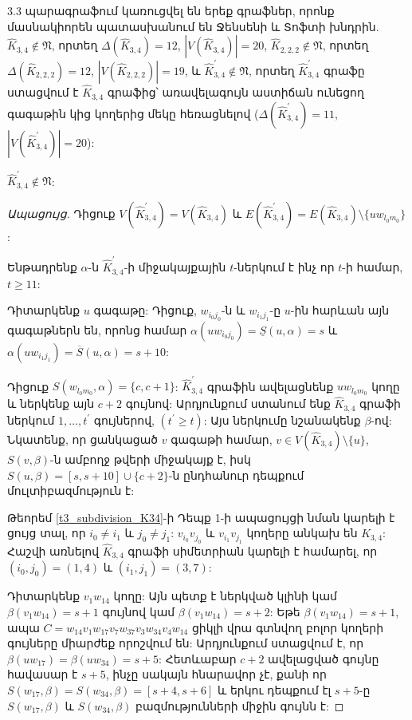 3.3 պարագրաֆում կառուցվել են երեք գրաֆներ, որոնք մասնակիորեն պատասխանում են Ջենսենի և Տոֆտի խնդրին. $\widehat{K}_{3,4} \notin \mathfrak{N}$, որտեղ $\Delta(\widehat{K}_{3,4})=12$, $|V(\widehat{K}_{3,4})|=20$, $\widehat{K}_{2,2,2} \notin \mathfrak{N}$, որտեղ $\Delta(\widehat{K}_{2,2,2})=12$, $|V(\widehat{K}_{2,2,2})|=19$, և  $\widehat{K}_{3,4}^{\prime} \notin \mathfrak{N}$, որտեղ $\widehat{K}_{3,4}^{\prime}$ գրաֆը ստացվում է $\widehat{K}_{3,4}$ գրաֆից՝ առավելագույն աստիճան ունեցող գագաթին կից կողերից մեկը հեռացնելով ($\Delta(\widehat{K}_{3,4}^{\prime})=11$, $|V(\widehat{K}_{3,4}^{\prime})|=20$):

\begin{hide}
\begin{theorem}
\label{t3_subdivision_K34_prime} $\widehat{K}_{3,4}^{\prime}\notin
\mathfrak{N}$:
\end{theorem}
\begin{proof}[Ապացույց]
Դիցուք $V(\widehat{K}_{3,4}^{\prime})= V(\widehat{K}_{3,4})$
և $E(\widehat{K}_{3,4}^{\prime})=E(\widehat{K}_{3,4})\setminus
\{uw_{l_{0}m_{0}}\}$:

Ենթադրենք $\alpha$-ն $\widehat{K}_{3,4}^{\prime}$-ի միջակայքային 
$t$-ներկում է ինչ որ $t$-ի համար, $t\geq 11$:

Դիտարկենք $u$ գագաթը: Դիցուք, $w_{i_{0}j_{0}}$-ն և $w_{i_{1}j_{1}}$-ը $u$-ին հարևան այն գագաթներն են, որոնց համար
$\alpha(uw_{i_{0}j_{0}})=\underline{S}(u,\alpha)=s$ և
$\alpha(uw_{i_{1}j_{1}})=\overline{S}(u,\alpha)=s+10$:

Դիցուք $S(w_{l_{0}m_{0}},\alpha)=\{c,c+1\}$: $\widehat{K}_{3,4}^{\prime}$ գրաֆին ավելացնենք 
$uw_{l_{0}m_{0}}$ կողը և ներկենք այն $c+2$ գույնով: Արդյունքում ստանում ենք $\widehat{K}_{3,4}$ գրաֆի ներկում $1,\ldots,t^{\prime}$ գույներով, 
$(t^{\prime}\geq t)$: Այս ներկումը նշանակենք $\beta$-ով: Նկատենք, որ ցանկացած $v$ գագաթի համար, $v\in V(\widehat{K}_{3,4})\setminus \{u\}$,
$S(v,\beta)$-ն ամբողջ թվերի միջակայք է, իսկ 
$S(u,\beta)=[s,s+10]\cup \{c+2\}$-ն ընդհանուր դեպքում մուլտիբազմություն է:

Թեորեմ \ref{t3_subdivision_K34}-ի Դեպք 1-ի ապացույցի նման կարելի է ցույց տալ, որ $i_{0}\neq i_{1}$ և
$j_{0}\neq j_{1}$: $v_{i_{0}}v_{j_{0}}$ և
$v_{i_{1}}v_{j_{1}}$ կողերը անկախ են $K_{3,4}$: Հաշվի առնելով $\widehat{K}_{3,4}$ գրաֆի սիմետրիան կարելի է համարել, որ
$(i_{0},j_{0})=(1,4)$ և $(i_{1},j_{1})=(3,7)$:

Դիտարկենք $v_{1}w_{14}$ կողը: Այն պետք է ներկված կլինի կամ
$\beta(v_{1}w_{14})=s+1$ գույնով կամ $\beta(v_{1}w_{14})=s+2$: Եթե
$\beta(v_{1}w_{14})=s+1$, ապա $C=w_{14}v_{1}w_{17}v_{7}w_{37}v_{3}w_{34}v_{4}w_{14}$ ցիկլի վրա գտնվող բոլոր կողերի գույները միարժեք որոշվում են: Արդյունքում ստացվում է, որ $\beta(uw_{17})=\beta(uw_{34})=s+5$: Հետևաբար $c+2$ ավելացված գույնը հավասար է $s+5$, ինչը սակայն հնարավոր չէ, քանի որ
$S(w_{17},\beta)=S(w_{34},\beta)=[s+4,s+6]$ և երկու դեպքում էլ $s+5$-ը $S(w_{17},\beta)$ և
$S(w_{34},\beta)$ բազմությունների միջին գույնն է:


\end{proof}
\end{hide}
